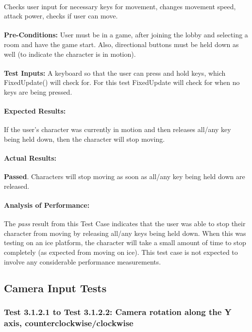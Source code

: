 \documentclass{article}
\begin{document}
    \paragraph{} Checks user input for necessary keys for movement, changes movement speed, attack power, checks if user can move.
    \paragraph{}\textbf{Pre-Conditions:} User must be in a game, after joining the lobby and selecting a room and have the game start. Also, directional buttons must be held down as well (to indicate the character is in motion). 
    \paragraph{}\textbf{Test Inputs:} A keyboard so that the user can press and hold keys, which FixedUpdate() will check for. For this test FixedUpdate will check for when no keys are being pressed.
    \paragraph{Expected Results:} If the user's character was currently in motion and then releases all/any key being held down, then the character will stop moving.
    \paragraph{Actual Results:} \textbf{Passed}. Characters will stop moving as soon as all/any key being held down are released. 
    \paragraph{Analysis of Performance:} The \emph{pass} result from this Test Case indicates that the user was able to stop their character from moving by releasing all/any keys being held down. When this was testing on an ice platform, the character will take a small amount of time to stop completely (as expected from moving on ice). This test case is not expected to involve any considerable performance measurements. 
    
    \subsection{Camera Input Tests}
    
    \subsubsection{Test 3.1.2.1 to Test 3.1.2.2: Camera rotation along the Y axis, counterclockwise/clockwise}
\end{document}
